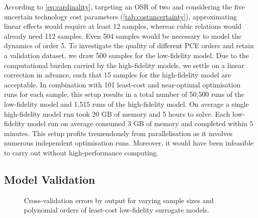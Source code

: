 According to \cref{eq:cardinality}, targeting an OSR of two
and considering the five uncertain technology cost parameters (\cref{tab:costuncertainty}),
approximating linear effects would require at least 12 samples, whereas cubic relations
would already need 112 samples. Even 504 samples would be necessary to model the dynamics of order 5.
To investigate the quality of different PCE orders
and retain a validation dataset,
we draw 500 samples for the low-fidelity model.
Due to the computational burden carried by the high-fidelity models,
we settle on a linear correction in advance, such that
15 samples for the high-fidelity model are acceptable.
In combination with 101 least-cost and near-optimal optimisation
runs for each sample, this setup results in a total number of
50,500 runs of the low-fidelity model and
1,515 runs of the high-fidelity model.
On average a single high-fidelity model run took 20 GB of memory and 5 hours to solve.
Each low-fidelity model run on average consumed 3 GB of memory and completed within 5 minutes. 
This setup profits tremendously from parallelisation as it involves
numerous independent optimisation runs.
Moreover, it would have been infeasible to carry out without high-performance computing.

\subsection{Model Validation}
\label{sec:validation}

\begin{figure}
    \noindent{}
    \noindent{}
    \caption[Cross-validation errors]{Cross-validation errors by output for varying sample sizes and polynomial orders
    of least-cost low-fidelity surrogate models.}
    \label{fig:error}
\end{figure}

